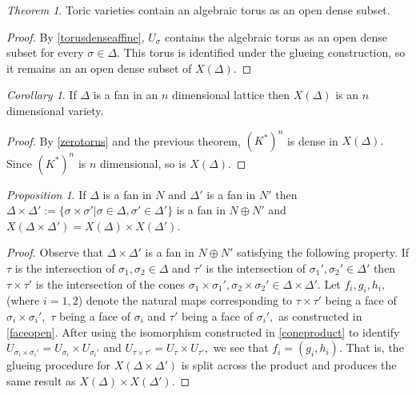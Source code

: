 \documentclass[BSc]{usydthesis}
\numberwithin{equation}{chapter}
\theoremstyle{remark}
\newtheorem{Theorem}[equation]{Theorem}
\newtheorem{Proposition}[equation]{Proposition}
\newtheorem{Corollary}[equation]{Corollary}
\begin{document}
\begin{Theorem} Toric varieties contain an algebraic torus as an open dense subset.
\end{Theorem}
\begin{proof} By \ref{torusdenseaffine}, $U_{\sigma}$ contains the algebraic torus as an open dense subset for every $\sigma \in \Delta.$ This torus is identified under the glueing construction, so it remains an an open dense subset of $X(\Delta).$
\end{proof}
\begin{Corollary}
 If $\Delta$ is a fan in an $n$ dimensional lattice then $X(\Delta)$ is an $n$ dimensional variety.
\end{Corollary}
\begin{proof}
 By \ref{zerotorus} and the previous theorem, $(K^*)^n$ is dense in $X(\Delta).$ Since $(K^*)^n$ is $n$ dimensional, so is $X(\Delta).$
\end{proof}


\begin{Proposition} If $\Delta$ is a fan in $N$ and $\Delta'$ is a fan in $N'$ then $\Delta \times \Delta' := \{ \sigma \times \sigma ' | \sigma \in \Delta, \sigma' \in \Delta' \}$ is a fan in $N \oplus N'$ and $X(\Delta \times \Delta') = X(\Delta) \times X(\Delta').$
\end{Proposition}

\begin{proof}

 Observe that $\Delta \times \Delta'$ is a fan in $N \oplus N'$ satisfying the following property. If $\tau$ is the intersection of $\sigma_1, \sigma_2 \in \Delta$ and $\tau'$ is the intersection of $\sigma_1', \sigma_2' \in \Delta'$ then $\tau \times \tau'$ is the intersection of the cones $\sigma_1 \times \sigma_1' , \sigma_2 \times \sigma_2' \in \Delta \times \Delta'.$ Let $f_i, g_i, h_i,$ (where $i=1,2$) denote the natural maps corresponding to $\tau \times \tau'$ being a face of $\sigma_i \times \sigma_i',$ $\tau$ being a face of $\sigma_i$ and $\tau'$ being a face of $\sigma_i',$ as constructed in \ref{faceopen}. After using the isomorphism constructed in \ref{coneproduct} to identify $U_{\sigma_i \times \sigma_i'} = U_{\sigma_i} \times U_{\sigma_i'}$ and $U_{\tau \times \tau'} = U_{\tau} \times U_{\tau'},$ we see that $f_i = (g_i, h_i).$ That is, the glueing procedure for $X(\Delta \times \Delta')$ is split across the product and produces the same result as $X(\Delta) \times X(\Delta').$
 
\end{proof}
\end{document}
